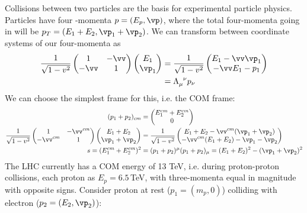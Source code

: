 \documentclass[relqm.tex]{subfiles}
\begin{document}
\chapter{}
Collisions between two particles are the basis for experimental particle physics. 
Particles have four -momenta $p=(E_p,\vp)$, where the total four-momenta going in will be $p_T=(E_1+E_2,\vp_1+\vp_2)$.
We can transform between coordinate systems of our four-momenta as
\begin{align}
    \frac{1}{\sqrt{1-v^2}}\begin{pmatrix}1& -\vv \\ -\vv & 1\end{pmatrix}\begin{pmatrix} E_1 \\ \vp_1\end{pmatrix} &= \frac{1}{\sqrt{1-v^2}}\begin{pmatrix} E_1-\vv\vp_1 \\ -\vv E_1 - p_1\end{pmatrix} \\
                                          &= \tensor{\Lambda}{_\mu^\nu}p_\nu
\end{align}
We can choose the simplest frame for this, i.e. the COM frame:
\begin{align}
    (p_1+p_2)_{cm} &= \begin{pmatrix} E_1^{cm} + E_2^{cm} \\ 0 \end{pmatrix} \\
    \frac{1}{\sqrt{1-v^2}}\begin{pmatrix}1& -\vv^{cm} \\ -\vv^{cm} & 1\end{pmatrix}\begin{pmatrix} E_1 + E_2 \\ \vp_1 + \vp_2\end{pmatrix} &= \frac{1}{\sqrt{1-v^2}}\begin{pmatrix} E_1 + E_2 -\vv^{cm}(\vp_1+\vp_2) \\ -\vv^{cm}( E_1+E_2) - \vp_1-\vp_2\end{pmatrix}  \\
    s = (E_1^{cm}+E_2^{cm})^2 &= (p_1+p_2)^\mu(p_1+p_2)_\mu = (E_1+E_2)^2 - (\vp_1+\vp_2)^2
\end{align}
The LHC currently has a COM energy of 13 TeV, i.e. during proton-proton collisions, each proton as $E_p=6.5\,$TeV, with three-momenta equal in magnitude with opposite signs. 
Consider proton at rest ($p_1=(m_p,0)$) colliding with electron ($p_2=(E_2,\vp_2)$):
\end{document}
